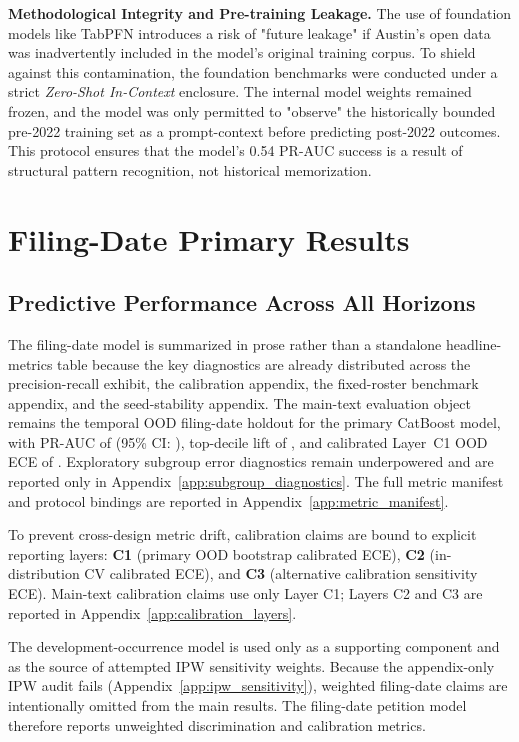 \documentclass[11pt, letterpaper]{article}
\begin{document}
\textbf{Methodological Integrity and Pre-training Leakage.} The use of foundation models like TabPFN introduces a risk of "future leakage" if Austin's open data was inadvertently included in the model's original training corpus. To shield against this contamination, the foundation benchmarks were conducted under a strict \textit{Zero-Shot In-Context} enclosure. The internal model weights remained frozen, and the model was only permitted to "observe" the historically bounded pre-2022 training set as a prompt-context before predicting post-2022 outcomes. This protocol ensures that the model's 0.54 PR-AUC success is a result of structural pattern recognition, not historical memorization.
 


\section{Filing-Date Primary Results}
\label{sec:results}

\subsection{Predictive Performance Across All Horizons}

The filing-date model is summarized in prose rather than a standalone headline-metrics table because the key diagnostics are already distributed across the precision-recall exhibit, the calibration appendix, the fixed-roster benchmark appendix, and the seed-stability appendix. The main-text evaluation object remains the temporal OOD filing-date holdout for the primary CatBoost model, with PR-AUC of \metricBootstrapFiling{} (95\% CI: \metricBootstrapFilingCI{}), top-decile lift of \metricTopDecileLift{}, and calibrated Layer~C1 OOD ECE of \metricECEOODBootstrapCalibrated{}. Exploratory subgroup error diagnostics remain underpowered and are reported only in Appendix~\ref{app:subgroup_diagnostics}. The full metric manifest and protocol bindings are reported in Appendix~\ref{app:metric_manifest}.

To prevent cross-design metric drift, calibration claims are bound to explicit reporting layers: \textbf{C1} (primary OOD bootstrap calibrated ECE), \textbf{C2} (in-distribution CV calibrated ECE), and \textbf{C3} (alternative calibration sensitivity ECE). Main-text calibration claims use only Layer C1; Layers C2 and C3 are reported in Appendix~\ref{app:calibration_layers}.

The development-occurrence model is used only as a supporting component and as the source of attempted IPW sensitivity weights. Because the appendix-only IPW audit fails (Appendix~\ref{app:ipw_sensitivity}), weighted filing-date claims are intentionally omitted from the main results. The filing-date petition model therefore reports unweighted discrimination and calibration metrics.
\end{document}
